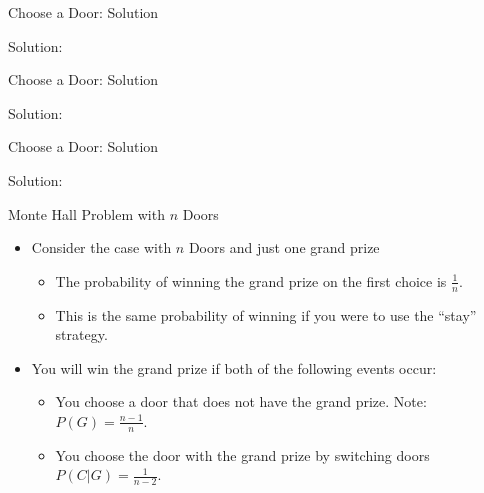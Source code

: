 \documentclass[
  ignorenonframetext,
]{beamer}
\providecommand{\tightlist}{%
  \setlength{\itemsep}{0pt}\setlength{\parskip}{0pt}}
\begin{document}
\begin{frame}{Choose a Door: Solution}
\protect\hypertarget{choose-a-door-solution}{}
\begin{tcolorbox}
Solution: 


\vspace{60mm}


\end{tcolorbox}
\end{frame}

\begin{frame}{Choose a Door: Solution}
\protect\hypertarget{choose-a-door-solution-1}{}
\begin{tcolorbox}
Solution: 

\vspace{60mm}

\end{tcolorbox}
\end{frame}

\begin{frame}{Choose a Door: Solution}
\protect\hypertarget{choose-a-door-solution-2}{}
\begin{tcolorbox}
Solution: 

\vspace{60mm}

\end{tcolorbox}
\end{frame}

\begin{frame}{Monte Hall Problem with \(n\) Doors}
\protect\hypertarget{monte-hall-problem-with-n-doors}{}
\begin{itemize}
\item
  Consider the case with \(n\) Doors and just one grand prize

  \begin{itemize}
  \tightlist
  \item
    The probability of winning the grand prize on the first choice is
    \(\frac{1}{n}\).
  \item
    This is the same probability of winning if you were to use the
    ``stay'' strategy.
  \end{itemize}
\item
  You will win the grand prize if both of the following events occur:

  \begin{itemize}
  \tightlist
  \item
    You choose a door that does not have the grand prize. Note:
    \(P(G)=\frac{n-1}{n}\).
  \item
    You choose the door with the grand prize by switching doors
    \(P(C|G)=\frac{1}{n-2}\).
  \end{itemize}
\end{itemize}
\end{frame}
\end{document}
